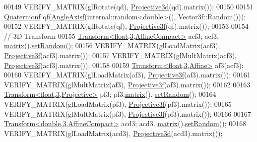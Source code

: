 \begin{DoxyCode}
00149   VERIFY\_MATRIX(glRotate(qd), \hyperlink{group___geometry___module_gab9cec8c457da930391eb73370e07aaae}{Projective3d}(qd).matrix());
00150   
00151   \hyperlink{group___geometry___module_class_eigen_1_1_quaternion}{Quaternionf} qf(\hyperlink{group___geometry___module_gadc7128416da41ca99bb8af814b78599e}{AngleAxisf}(internal::random<double>(), Vector3f::Random()));
00152   VERIFY\_MATRIX(glRotate(qf), \hyperlink{group___geometry___module_gab14804071b7486b6666f3d324475a478}{Projective3f}(qf).matrix());
00153   
00154   \textcolor{comment}{// 3D Transform}
00155   \hyperlink{group___geometry___module_class_eigen_1_1_transform}{Transform<float,3,AffineCompact>} acf3; acf3.
      \hyperlink{group___geometry___module_aec8168000a88a807130d41020af98d47}{matrix}().\hyperlink{class_eigen_1_1_plain_object_base_af0e576a0e1aefc9ee346de44cc352ba3}{setRandom}();
00156   VERIFY\_MATRIX(glLoadMatrix(acf3), \hyperlink{group___geometry___module_gab14804071b7486b6666f3d324475a478}{Projective3f}(acf3).matrix());
00157   VERIFY\_MATRIX(glMultMatrix(acf3), \hyperlink{group___geometry___module_gab14804071b7486b6666f3d324475a478}{Projective3f}(acf3).matrix());
00158   
00159   \hyperlink{group___geometry___module_class_eigen_1_1_transform}{Transform<float,3,Affine>} af3(acf3);
00160   VERIFY\_MATRIX(glLoadMatrix(af3), \hyperlink{group___geometry___module_gab14804071b7486b6666f3d324475a478}{Projective3f}(af3).matrix());
00161   VERIFY\_MATRIX(glMultMatrix(af3), \hyperlink{group___geometry___module_gab14804071b7486b6666f3d324475a478}{Projective3f}(af3).matrix());
00162   
00163   \hyperlink{group___geometry___module_class_eigen_1_1_transform}{Transform<float,3,Projective>} pf3; pf3.\hyperlink{group___geometry___module_aec8168000a88a807130d41020af98d47}{matrix}().
      \hyperlink{class_eigen_1_1_plain_object_base_af0e576a0e1aefc9ee346de44cc352ba3}{setRandom}();
00164   VERIFY\_MATRIX(glLoadMatrix(pf3), \hyperlink{group___geometry___module_gab14804071b7486b6666f3d324475a478}{Projective3f}(pf3).matrix());
00165   VERIFY\_MATRIX(glMultMatrix(pf3), \hyperlink{group___geometry___module_gab14804071b7486b6666f3d324475a478}{Projective3f}(pf3).matrix());
00166   
00167   \hyperlink{group___geometry___module_class_eigen_1_1_transform}{Transform<double,3,AffineCompact>} acd3; acd3.
      \hyperlink{group___geometry___module_aec8168000a88a807130d41020af98d47}{matrix}().\hyperlink{class_eigen_1_1_plain_object_base_af0e576a0e1aefc9ee346de44cc352ba3}{setRandom}();
00168   VERIFY\_MATRIX(glLoadMatrix(acd3), \hyperlink{group___geometry___module_gab9cec8c457da930391eb73370e07aaae}{Projective3d}(acd3).matrix());

\end{DoxyCode}
